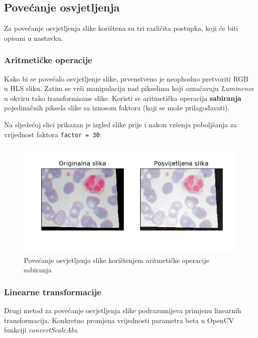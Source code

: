 \documentclass[12pt,a4paper]{article}
\begin{document}
\subsection{Povećanje osvjetljenja}

Za povećanje osvjetljenja slike korištena su tri različita postupka, koji će biti opisani u nastavku.

\subsubsection{Aritmetičke operacije}

Kako bi se povećalo osvjetljenje slike, prvenstveno je neophodno pretvoriti RGB u HLS sliku. Zatim se vrši manipulacija nad pikselima koji označavaju \textit{Luminence} u okviru tako transformisane slike. Koristi se aritmetička operacija \textbf{sabiranja} pojedinačnih piksela slike sa iznosom faktora (koji se može prilagođavati).


Na sljedećoj slici prikazan je izgled slike prije i nakon vršenja poboljšanja za vrijednost faktora \texttt{factor = 30}:

\begin{figure}[H]

\center
\includegraphics[scale=0.9]{s6Osvjetljenje1.png}
\caption{Povećanje osvjetljenja slike korištenjem aritmetičke operacije sabiranja}

\end{figure}

\subsubsection{Linearne transformacije}

Drugi metod za povećanje osvjetljenja slike podrazumijeva primjenu linearnih transformacija. Konkretno promjena vrijednosti parametra beta u OpenCV funkciji \textit{convertScaleAbs}.
\end{document}
